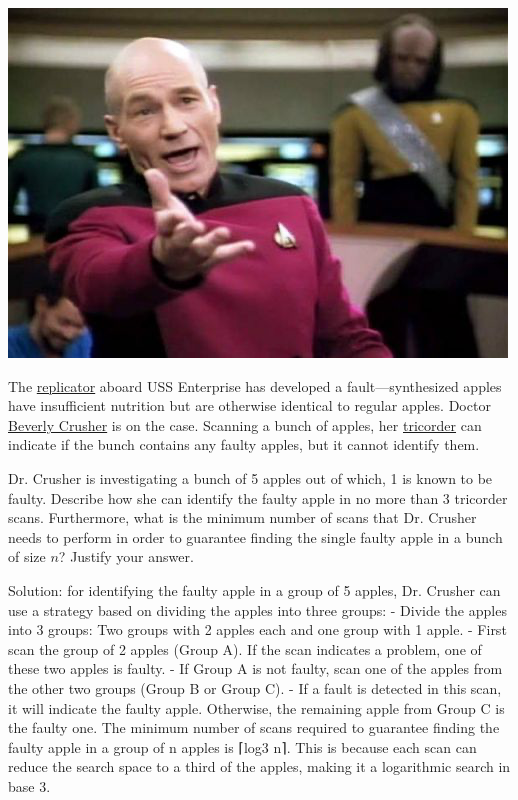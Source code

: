 \documentclass[a4paper]{exam}
\begin{document}
\begin{questions}
  \begin{minipage}{.3\linewidth}
  \centerline{\includegraphics[width=\textwidth]{picard}}
\end{minipage}
\begin{minipage}{.65\linewidth}
  The \href{https://en.wikipedia.org/wiki/Replicator_(Star_Trek)}{replicator} aboard USS Enterprise has developed a fault---synthesized apples have insufficient nutrition but are otherwise identical to regular apples. Doctor \href{https://memory-alpha.fandom.com/wiki/Beverly_Crusher}{Beverly Crusher} is on the case. Scanning a bunch of apples, her \href{https://en.wikipedia.org/wiki/Medical_tricorder}{tricorder} can indicate if the bunch contains any faulty apples, but it cannot identify them.
\end{minipage}

  Dr. Crusher is investigating a bunch of 5 apples out of which, 1 is known to be faulty. Describe how she can identify the faulty apple in no more than 3 tricorder scans. Furthermore, what is the minimum number of scans that Dr. Crusher needs to perform in order to guarantee finding the single faulty apple in a bunch of size $n$? Justify your answer.

  \begin{solution}
    Solution: for identifying the faulty apple in a group of 5 apples, Dr. Crusher can use
a strategy based on dividing the apples into three groups:
- Divide the apples into 3 groups: Two groups with 2 apples each and one group with
1 apple. - First scan the group of 2 apples (Group A). If the scan indicates a problem,
one of these two apples is faulty. - If Group A is not faulty, scan one of the apples from
the other two groups (Group B or Group C). - If a fault is detected in this scan, it will
indicate the faulty apple. Otherwise, the remaining apple from Group C is the faulty
one.
The minimum number of scans required to guarantee finding the faulty apple in a group
of n apples is ⌈log3 n⌉. This is because each scan can reduce the search space to a third
of the apples, making it a logarithmic search in base 3.
    \end{solution}


      
\end{questions}
\end{document}
